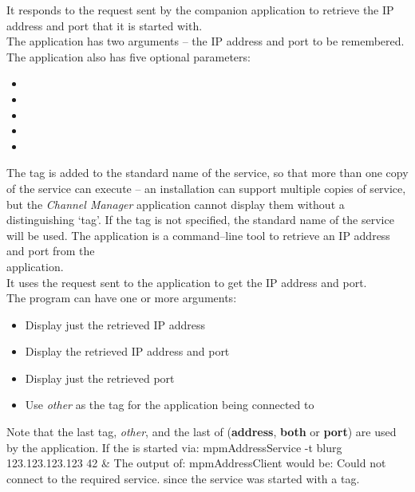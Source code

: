 It responds to the  request sent by the
companion application  to retrieve the IP address and port
that it is started with.\\

The application has two arguments -- the IP address and port to be remembered.
The application also has five optional parameters:
\begin{itemize}
\item {}
\item {}
\item {}
\item {}
\item {}
\end{itemize}
The tag is added to the standard name of the service, so that more than one copy of the
service can execute -- an \mplusm{} installation can support multiple copies of 
 service, but the \emph{Channel Manager} application
cannot display them without a distinguishing `tag'.
If the tag is not specified, the standard name of the service will be used.
The  application is a command--line tool to
retrieve an IP address and port from the\\
 application.\\

It uses the  request sent to the
 application to get the IP address and port.\\

The program can have one or more arguments:
\begin{itemize}
\item {} Display just the retrieved IP address
\item {} Display the retrieved IP address and port
\item {} Display just the retrieved port
\item {} Use \emph{other} as the tag for the
 application being connected to
\end{itemize}
Note that the last tag, \emph{other}, and the last of (\textbf{address}, \textbf{both} or
\textbf{port}) are used by the application.
\newpage
If the  is started via:
\outputBegin{}
mpmAddressService -t blurg 123.123.123.123 42 \&
\outputEnd{}
The output of:
\outputBegin{}
mpmAddressClient
\outputEnd{}
would be:
\outputBegin{}
Could not connect to the required service.
\outputEnd{}
since the service was started with a tag.\\

